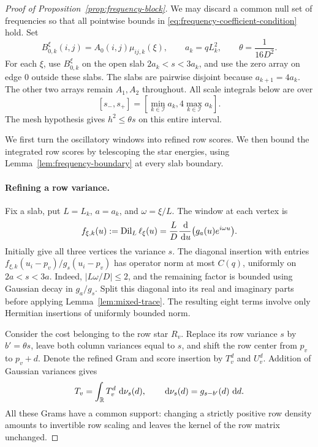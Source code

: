 \begin{proof}[Proof of Proposition~\ref{prop:frequency-block}]
We may discard a common null set of frequencies so that all pointwise
bounds in \eqref{eq:frequency-coefficient-condition} hold.  Set
\begin{equation}\label{eq:frequency-slabs}
 B_{0,k}^\xi(i,j)=A_0(i,j)\mu_{ij,k}(\xi),\qquad
 a_k=qL_k^2,\qquad
 \theta=\frac1{16D^2}.
\end{equation}
For each $\xi$, use $B_{0,k}^\xi$ on the open slab
$2a_k<s<3a_k$, and use the zero array on edge $0$ outside these
slabs.  The slabs are pairwise disjoint because $a_{k+1}=4a_k$.
The other two arrays remain $A_1,A_2$ throughout.  All scale
integrals below are over
\[
 [s_-,s_+]=[\min_{k\in\mathcal I}a_k,
                         4\max_{k\in\mathcal I}a_k].
\]
The mesh hypothesis gives $h^2\leq\theta s$ on this entire interval.

We first turn the oscillatory windows into refined row scores.  We
then bound the integrated row scores by telescoping the star energies,
using Lemma~\ref{lem:frequency-boundary} at every slab boundary.

\paragraph{Refining a row variance.}
Fix a slab, put $L=L_k$, $a=a_k$, and $\omega=\xi/L$.  The window
at each vertex is
\begin{equation}\label{eq:frequency-scaled-window}
 f_{\xi,k}(u):=\operatorname{Dil}_L\ell_\xi(u)
   =\frac LD\frac{\,\mathrm d}{\,\mathrm d u}
                  \bigl(g_a(u)e^{i\omega u}\bigr).
\end{equation}
Initially give all three vertices the variance $s$.  The diagonal
insertion with entries $f_{\xi,k}(u_i-p_v)/g_s(u_i-p_v)$ has
operator norm at most $C(q)$, uniformly on $2a<s<3a$.  Indeed,
$|L\omega/D|\leq2$, and the remaining factor is bounded using
Gaussian decay in $g_a/g_s$.  Split this diagonal into its real
and imaginary parts before applying Lemma~\ref{lem:mixed-trace}.
The resulting eight terms involve only Hermitian insertions of
uniformly bounded norm.

Consider the cost belonging to the row star $R_v$.  Replace its row
variance $s$ by $b'=\theta s$, leave both column variances equal
to $s$, and shift the row center from $p_v$ to $p_v+d$.  Denote
the refined Gram and score insertion by $T_v^d$ and $U_v^d$.
Addition of Gaussian variances gives
\begin{equation}\label{eq:frequency-gram-average}
 T_v=\int_{\mathbb R}T_v^d\,\,\mathrm d\nu_s(d),
 \qquad \,\mathrm d\nu_s(d)=g_{s-b'}(d)\,\,\mathrm d d.
\end{equation}
All these Grams have a common support: changing a strictly positive
row density amounts to invertible row scaling and leaves the kernel
of the row matrix unchanged.


\end{proof}
